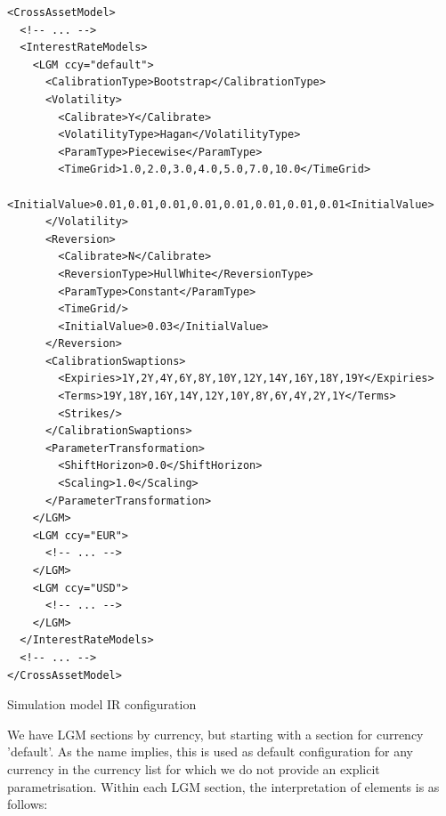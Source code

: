 \documentclass[12pt, a4paper]{article}
\begin{document}
{\begin{listing}[H]
\begin{verbatim}
<CrossAssetModel>	
  <!-- ... -->
  <InterestRateModels>
    <LGM ccy="default">
      <CalibrationType>Bootstrap</CalibrationType>
      <Volatility>
        <Calibrate>Y</Calibrate>
        <VolatilityType>Hagan</VolatilityType>
        <ParamType>Piecewise</ParamType>
        <TimeGrid>1.0,2.0,3.0,4.0,5.0,7.0,10.0</TimeGrid>
        <InitialValue>0.01,0.01,0.01,0.01,0.01,0.01,0.01,0.01<InitialValue>
      </Volatility>
      <Reversion>
        <Calibrate>N</Calibrate>
        <ReversionType>HullWhite</ReversionType>
        <ParamType>Constant</ParamType>
        <TimeGrid/>
        <InitialValue>0.03</InitialValue>
      </Reversion>
      <CalibrationSwaptions>
        <Expiries>1Y,2Y,4Y,6Y,8Y,10Y,12Y,14Y,16Y,18Y,19Y</Expiries>
        <Terms>19Y,18Y,16Y,14Y,12Y,10Y,8Y,6Y,4Y,2Y,1Y</Terms>
        <Strikes/>
      </CalibrationSwaptions>
      <ParameterTransformation>
        <ShiftHorizon>0.0</ShiftHorizon>
        <Scaling>1.0</Scaling>
      </ParameterTransformation>
    </LGM>
    <LGM ccy="EUR">
      <!-- ... -->
    </LGM>
    <LGM ccy="USD">
      <!-- ... -->
    </LGM>
  </InterestRateModels>	
  <!-- ... -->		
</CrossAssetModel>
\end{verbatim}
\caption{Simulation model IR configuration}
\label{lst:simulation_model_ir_configuration}
\end{listing}

We have LGM sections by currency, but starting with a section for currency 'default'. As the name implies, this is used
as default configuration for any currency in the currency list for which we do not provide an explicit
parametrisation. Within each LGM section, the interpretation of elements is as follows:

}
\end{document}

